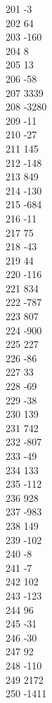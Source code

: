 { 201	-3 \\
 202	64 \\
 203	-160 \\
 204	8 \\
 205	13 \\
 206	-58 \\
 207	3339 \\
 208	-3280 \\
 209	-11 \\
 210	-27 \\
 211	145 \\
 212	-148 \\
 213	849 \\
 214	-130 \\
 215	-684 \\
 216	-11 \\
 217	75 \\
 218	-43 \\
 219	44 \\
 220	-116 \\
 221	834 \\
 222	-787 \\
 223	807 \\
 224	-900 \\
 225	227 \\
 226	-86 \\
 227	33 \\
 228	-69 \\
 229	-38 \\
 230	139 \\
 231	742 \\
 232	-807 \\
 233	-49 \\
 234	133 \\
 235	-112 \\
 236	928 \\
 237	-983 \\
 238	149 \\
 239	-102 \\
 240	-8 \\
 241	-7 \\
 242	102 \\
 243	-123 \\
 244	96 \\
 245	-31 \\
 246	-30 \\
 247	92 \\
 248	-110 \\
 249	2172 \\
 250	-1411 \\
}
